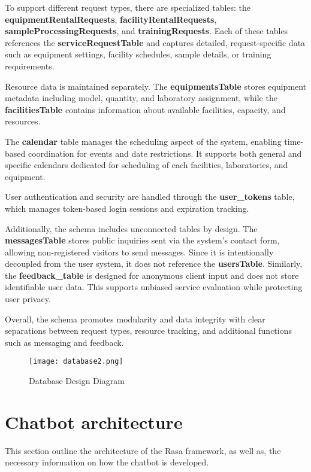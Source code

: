 To support different request types, there are specialized tables: the \textbf{equipmentRentalRequests}, \textbf{facilityRentalRequests}, \textbf{sampleProcessingRequests}, and \textbf{trainingRequests}. Each of these tables references the \textbf{serviceRequestTable} and captures detailed, request-specific data such as equipment settings, facility schedules, sample details, or training requirements.

Resource data is maintained separately. The \textbf{equipmentsTable} stores equipment metadata including model, quantity, and laboratory assignment, while the \textbf{facilitiesTable} contains information about available facilities, capacity, and resources. 

The \textbf{calendar} table manages the scheduling aspect of the system, enabling time-based coordination for events and date restrictions. It supports both general and specific calendars dedicated for scheduling of each facilities, laboratories, and equipment.

User authentication and security are handled through the \textbf{user\_tokens} table, which manages token-based login sessions and expiration tracking.

Additionally, the schema includes unconnected tables by design. The \textbf{messagesTable} stores public inquiries sent via the system's contact form, allowing non-registered visitors to send messages. Since it is intentionally decoupled from the user system, it does not reference the \textbf{usersTable}. Similarly, the \textbf{feedback\_table} is designed for anonymous client input and does not store identifiable user data. This supports unbiased service evaluation while protecting user privacy.

Overall, the schema promotes modularity and data integrity with clear separations between request types, resource tracking, and additional functions such as messaging and feedback.

\newpage

\begin{figure}[h]
	\centering 
	\texttt{[image: database2.png]}
	\caption{Database Design Diagram}
	\label{fig:database}
\end{figure}

\section{Chatbot architecture}

This section outline the architecture of the Rasa framework, as well as, the necessary information on how the chatbot is developed.

